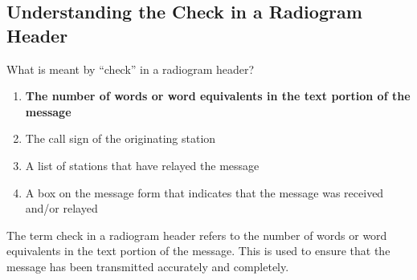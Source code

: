 \subsection{Understanding the Check in a Radiogram Header}
\label{T2C11}

\begin{tcolorbox}[colback=gray!10!white,colframe=black!75!black,title=T2C11]
What is meant by “check” in a radiogram header?
\begin{enumerate}[noitemsep]
    \item \textbf{The number of words or word equivalents in the text portion of the message}
    \item The call sign of the originating station
    \item A list of stations that have relayed the message
    \item A box on the message form that indicates that the message was received and/or relayed
\end{enumerate}
\end{tcolorbox}

The term check in a radiogram header refers to the number of words or word equivalents in the text portion of the message. This is used to ensure that the message has been transmitted accurately and completely.